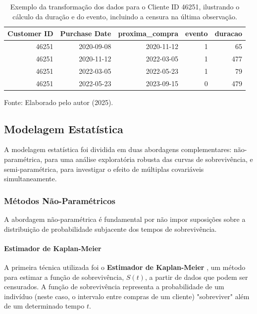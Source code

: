 \begin{table}[h!]
\centering
\caption{Exemplo da transformação dos dados para o Cliente ID 46251, ilustrando o cálculo da duração e do evento, incluindo a censura na última observação.}
\label{tab:exemplo_survival_metodologia}
\begin{tabular}{rrrrr}
\hline
\textbf{Customer ID} & \textbf{Purchase Date} & \textbf{proxima\_compra} & \textbf{evento} & \textbf{duracao} \\
\hline
46251 & 2020-09-08 & 2020-11-12 & 1 & 65 \\
46251 & 2020-11-12 & 2022-03-05 & 1 & 477 \\
46251 & 2022-03-05 & 2022-05-23 & 1 & 79 \\
46251 & 2022-05-23 & 2023-09-15 & 0 & 479 \\
\hline
\end{tabular}
\end{table}
\begin{flushleft}
\footnotesize Fonte: Elaborado pelo autor (2025).
\end{flushleft}


\subsection{Modelagem Estatística}
A modelagem estatística foi dividida em duas abordagens complementares: não-paramétrica, para uma análise exploratória robusta das curvas de sobrevivência, e semi-paramétrica, para investigar o efeito de múltiplas covariáveis simultaneamente.

\subsubsection{Métodos Não-Paramétricos}
A abordagem não-paramétrica é fundamental por não impor suposições sobre a distribuição de probabilidade subjacente dos tempos de sobrevivência.

\paragraph{Estimador de Kaplan-Meier}
A primeira técnica utilizada foi o \textbf{Estimador de Kaplan-Meier} \cite{kaplan_meier_1958}, um método para estimar a função de sobrevivência, $S(t)$, a partir de dados que podem ser censurados. A função de sobrevivência representa a probabilidade de um indivíduo (neste caso, o intervalo entre compras de um cliente) "sobreviver" além de um determinado tempo $t$.

